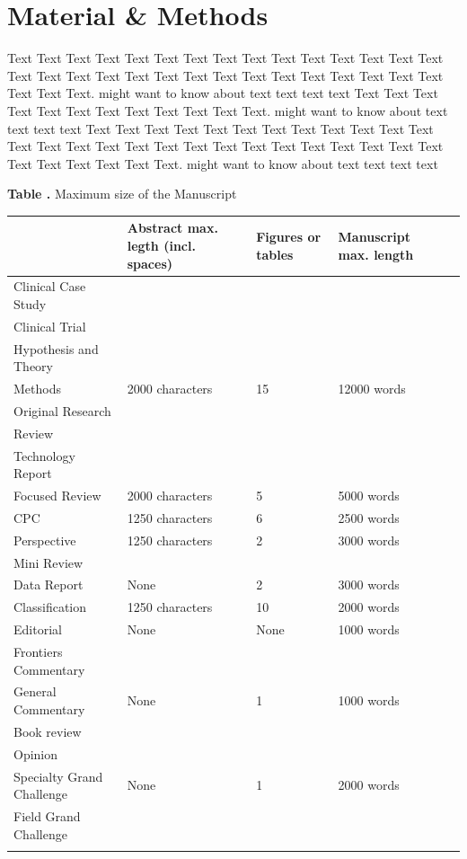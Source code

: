\documentclass{frontiersSCNS} %
\begin{document}
\section{Material \& Methods}

Text Text Text Text Text Text  Text Text Text Text Text Text \cite{conference} Text Text Text  Text Text Text Text Text Text Text Text Text Text  Text Text Text Text Text Text  Text Text.  \cite{patent} might want to know about  text text text text Text Text Text Text  Text Text Text Text Text Text  Text Text. \citep{article} might want to know about  text text text text
Text Text Text Text Text Text  Text Text Text Text Text Text Text Text Text  Text Text Text Text Text Text Text Text Text Text  Text Text Text Text Text Text  Text Text.  \cite{book} might want to know about  text text text text \cite{chapter}

\begin{table}[!t]
\textbf{\label{Tab:01} Table .}{ Maximum size of the Manuscript }

\processtable{ }
{\begin{tabular}{lllll}\toprule
 & Abstract max. legth (incl. spaces) & Figures or tables & Manuscript max. length \\\midrule
Clinical Case Study & & & &\\
Clinical Trial & & & &\\
Hypothesis and Theory & & & &\\
Methods & 2000 characters  & 15 & 12000 words \\
Original Research & & & &\\
Review & & & &\\
Technology Report & & & &\\\midrule
Focused Review & 2000 characters & 5 & 5000 words \\\midrule
CPC &  1250 characters& 6 & 2500 words  \\\midrule
Perspective & 1250 characters & 2 & 3000 words  \\
Mini Review & & & &\\\midrule
Data Report & None & 2 & 3000 words\\\midrule
Classification & 1250 characters & 10 & 2000 words \\\midrule
Editorial & None & None & 1000 words  \\\midrule
Frontiers Commentary  & & &\\
General Commentary & None & 1 & 1000 words\\
Book review & & & \\\midrule
Opinion   & & &\\
Specialty Grand Challenge & None & 1 & 2000 words\\
Field Grand Challenge & & & &\\\botrule
\end{tabular}}{}
\end{table}
\end{document}
